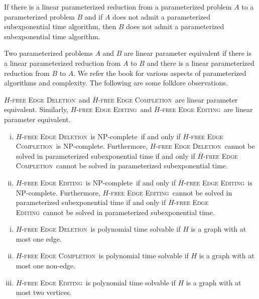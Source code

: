 \documentclass[envcountsame,envcountsect,10pt,oribibl]{llncs}
\newcommand{\pname}[1]{\textnormal{\textsc{#1}}}
\newcommand{\cclass}[1]{\textnormal{\textsf{#1}}}
\newcommand{\HED}{\pname{$H$-free Edge Deletion}}
\newcommand{\HEC}{\pname{$H$-free Edge Completion}}
\newcommand{\HEE}{\pname{$H$-free Edge Editing}}
\newcommand{\HBEC}{\pname{$\overline{H}$-free Edge Completion}}
\newcommand{\HBEE}{\pname{$\overline{H}$-free Edge Editing}}
\newcommand{\NPC}{\cclass{NP-complete}}
\begin{document}
\begin{proposition}
  \label{pro:lpr}
  If there is a linear parameterized reduction from a parameterized problem $A$
  to a parameterized problem $B$ and if $A$ does not admit a parameterized subexponential
  time algorithm, then $B$ does not admit a parameterized subexponential time algorithm.
\end{proposition}

Two parameterized problems $A$ and $B$ are linear parameter equivalent if there is a linear 
parameterized reduction from $A$ to $B$ and there is a linear parameterized reduction from 
$B$ to $A$. We refer the book \cite{DBLP:books/sp/CyganFKLMPPS15} for various aspects of 
parameterized algorithms and complexity.
The following are some folklore observations.

\begin{proposition}
  \label{pro:folklore}
  \HED\ and \HBEC\ are linear parameter equivalent. Similarly,
  \HEE\ and \HBEE\ are linear parameter equivalent.
\end{proposition}

\begin{proposition}
  \label{pro:equivalence}
  \begin{enumerate}[(i)]
  \item\label{item:dc-equivalence} \HED\ is \NPC\ if and only if \HBEC\ is \NPC.
    Furthermore, \HED\ cannot be solved in parameterized subexponential time
    if and only if \HBEC\ cannot be solved in parameterized subexponential time.
  \item\label{item:ee-equivalence} \HEE\ is \NPC\ if and only if \HBEE\ is \NPC.
    Furthermore, \HEE\ cannot be solved in parameterized subexponential time
    if and only if \HBEE\ cannot be solved in parameterized subexponential time.
  \end{enumerate}
\end{proposition}

\begin{proposition}
  \label{pro:polynomial}
  \begin{enumerate}[(i)]
  \item\label{item:poly-deletion} \HED\ is polynomial time solvable if $H$ is a graph with
    at most one edge.
  \item\label{item:poly-completion} \HEC\ is polynomial time solvable if $H$ is a graph with
    at most one non-edge.
  \item\label{item:poly-editing} \HEE\ is polynomial time solvable if $H$ is a graph with
  at most two vertices.
  \end{enumerate}
\end{proposition}
\end{document}
